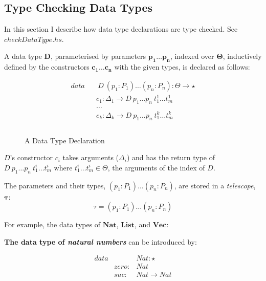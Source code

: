 \subsection{Type Checking Data Types}
\label{sec:datatypes}

In this section I describe how data type declarations are type checked. See \emph{$checkDataType.hs$}.

A data type $\boldsymbol{D}$, parameterised by parameters $\boldsymbol{p_1 \dots p_n}$, indexed over $\boldsymbol{\Theta}$, inductively defined by the constructors $\boldsymbol{c_1 \dots c_n}$ with the given types, is declared as follows:

\begin{figure}[H]
  \centering
  \begin{equation*}
    \begin{aligned}
      data &  & \: D \: (p_1:P_1) \dots (p_n:P_n) : \Theta \to \star       \\
           &  & c_1 : \Delta_1 \to D \: p_1 \dots p_n \: t_1^1 \dots t_m^1 \\
           &  & \dots                                                      \\
           &  & c_k : \Delta_k \to D \: p_1 \dots p_n \: t_1^k \dots t_m^k \\                                                           \\
    \end{aligned}
  \end{equation*}
  \caption{A Data Type Declaration}
  \label{fig:datatype}
\end{figure}

$D$'s constructor $c_i$ takes arguments ($\Delta_i$) and has the return type of $D \: p_1 \dots p_n \: t_1^i \dots t_m^i$ where $t_1^i \dots t_m^i \in \Theta$, the arguments of the index of $D$.

The parameters and their types, $(p_1:P_1) \dots (p_n:P_n)$, are stored in a \emph{telescope}, $\boldsymbol{\tau}$:
\begin{equation*}
  \tau = (p_1:P_1) \dots (p_n:P_n)
\end{equation*}


For example, the data types of $\boldsymbol{Nat}$, $\boldsymbol{List}$, and $\boldsymbol{Vec}$:

\textbf{The data type of \emph{natural numbers}} can be introduced by:

\begin{equation*}
  \begin{aligned}
    data &       & Nat : \star \\
         & zero: & Nat         \\
         & suc:  & Nat \to Nat \\
  \end{aligned}
\end{equation*}

